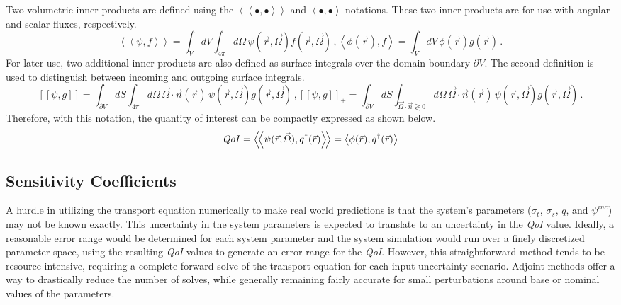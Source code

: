 \documentclass[12pt]{report}
\newcommand{\vr}{\vec{r}}
\newcommand{\vO}{\vec{\Omega}}
\newcommand{\bra}{\left\langle}
\newcommand{\ket}{\right\rangle}
\newcommand{\braSN}{\left\langle \! \left\langle}
\newcommand{\ketSN}{\right\rangle \! \right\rangle}
\newcommand{\sbraSN}{\left[ \! \left[}
\newcommand{\sketSN}{\right] \! \right]}
\newcommand{\bound}{\partial V}
\newcommand{\vn}{\vec{n}}
\newcommand{\sigt}{\sigma_t}
\newcommand{\sigs}{\sigma_s}
\newcommand{\scalResp}{q^\dag}
\newcommand{\qoi}{{\it QoI}\xspace}
\begin{document}
Two volumetric inner products are defined using  the $\braSN \bullet , \bullet \ketSN$ and $\bra \bullet , \bullet \ket$ notations. These two inner-products are for use with angular and scalar fluxes, respectively. 
\begin{subequations}
\begin{equation}
\braSN \psi , f \ketSN  = \int_V dV \int_{4 \pi} d \Omega \,  \psi(\vr, \vO)f(\vr, \vO) \,,
\end{equation}
\begin{equation}
\bra \phi(\vr) , f \ket  = \int_V dV \,  \phi(\vr) g(\vr) \,.
\end{equation}
\end{subequations}
For later use, two additional inner products are also defined as surface integrals over the domain 
boundary $\partial V$. The second definition is used to distinguish between incoming and outgoing surface integrals.
\begin{subequations}
\begin{equation}
\sbraSN \psi , g \sketSN  = \int_{\bound} dS \int_{4 \pi} d \Omega \, \vO \cdot \vn(\vr) \, \psi(\vr, \vO)g(\vr, \vO) \,,
\end{equation}
\begin{equation}
\sbraSN \psi , g \sketSN_{\pm}   = \int_{\bound} dS \int_{\vO \cdot \vn \gtrless 0} d\Omega \,  \vO \cdot \vn(\vr) \, \psi(\vr, \vO)g(\vr, \vO) \,.
\end{equation}
\end{subequations}
Therefore, with this notation, the quantity of interest can be compactly expressed as shown below.
\begin{equation}
\label{QoIDef}
\qoi = \braSN \psi(\vr,\vO), \scalResp(\vr) \ketSN  = \bra \phi(\vr) , \scalResp(\vr) \ket
\end{equation}

\subsection{Sensitivity Coefficients}
A hurdle in utilizing the transport equation numerically to make real world predictions is that 
the system's parameters ($\sigt$, $\sigs$, $q$, and $\psi^{inc}$) may not be known exactly. This uncertainty in 
the system parameters is expected to translate to an uncertainty in the \qoi value. Ideally, a reasonable error 
range would be determined for each system parameter and the system simulation would run over a finely 
discretized parameter space, using the resulting \qoi values to generate an error range for the \qoi. 
However, this straightforward method tends to be resource-intensive, requiring a complete forward solve 
of the transport equation for each input uncertainty scenario. Adjoint methods offer a way to drastically 
reduce the number of solves, while generally remaining fairly accurate for small perturbations around 
base or nominal values of the parameters.
\end{document}
